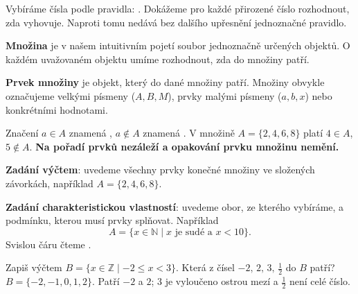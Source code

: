 \documentclass[11pt,a4paper]{article}
\begin{document}
Vybíráme čísla podle pravidla: .
Dokážeme pro každé přirozené číslo rozhodnout, zda vyhovuje. Naproti tomu
 nedává bez dalšího upřesnění jednoznačné pravidlo.

\begin{definiceBox}[title={Definice - Množina}]
\textbf{Množina} je v našem intuitivním pojetí soubor jednoznačně určených
objektů. O každém uvažovaném objektu umíme rozhodnout, zda do množiny patří.
\end{definiceBox}
\begin{definiceBox}[title={Definice - Prvek množiny}]
\textbf{Prvek množiny} je objekt, který do dané množiny patří.
Množiny obvykle označujeme velkými písmeny ($A,B,M$), prvky malými
písmeny ($a,b,x$) nebo konkrétními hodnotami.
\end{definiceBox}

Značení $a\in A$ znamená , $a\notin A$ znamená
. V množině $A=\{2,4,6,8\}$ platí
$4\in A$, $5\notin A$. \textbf{Na pořadí prvků nezáleží a opakování
prvku množinu nemění.}

\begin{definiceBox}[title={Definice - Zadání množiny výčtem}]
\textbf{Zadání výčtem}: uvedeme všechny prvky konečné množiny ve
složených závorkách, například $A=\{2,4,6,8\}$.
\end{definiceBox}
\begin{definiceBox}[title={Definice - Zadání množiny charakteristickou vlastností}]
\textbf{Zadání charakteristickou vlastností}: uvedeme obor, ze kterého
vybíráme, a podmínku, kterou musí prvky splňovat. Například
\[A=\{x\in\mathbb N\mid x\text{ je sudé a }x<10\}.\]
Svislou čáru čteme .
\end{definiceBox}


\begin{prikladReseniBox}[title={Příklad 1}]
Zapiš výčtem $B=\{x\in\mathbb Z\mid -2\le x<3\}$.
Která z čísel $-2,\,2,\,3,\,\tfrac12$ do $B$ patří?
\tcblower
$B=\{-2,-1,0,1,2\}$. Patří $-2$ a $2$; $3$ je vyloučeno
ostrou mezí a $\tfrac12$ není celé číslo.
\end{prikladReseniBox}
\end{document}
